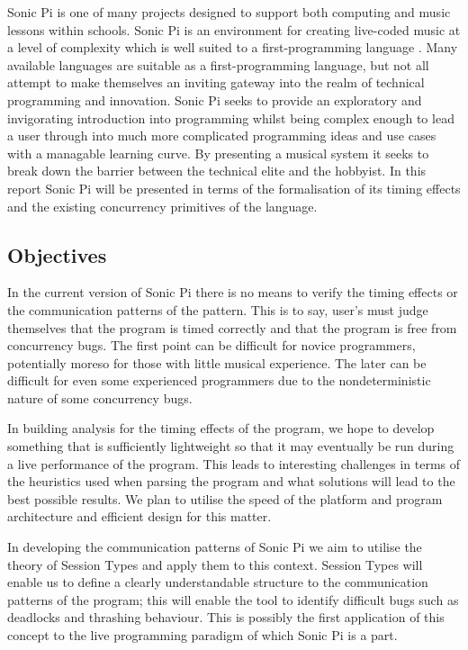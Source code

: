 \documentclass[11pt]{scrartcl}
\begin{document}
Sonic Pi is one of many projects designed to support both computing and music 
lessons within schools. Sonic Pi is an environment for creating live-coded 
music at a level of complexity which is well suited to a first-programming 
language \cite{sp}. Many available languages are suitable as a first-programming 
language, but not all attempt to make themselves an inviting gateway into the 
realm of technical programming and innovation. Sonic Pi seeks to provide an 
exploratory and invigorating introduction into programming whilst being complex 
enough to lead a user through into much more complicated programming ideas and 
use cases with a managable learning curve. By presenting a musical system it 
seeks to break down the barrier between the technical elite and the hobbyist. In 
this report Sonic Pi will be presented in terms of the formalisation of its 
timing effects and the existing concurrency primitives of the language. 

\subsection{Objectives}
In the current version of Sonic Pi there is no means to verify the timing effects
or the communication patterns of the pattern. This is to say, user's must judge
themselves that the program is timed correctly and that the program is free from
concurrency bugs. The first point can be difficult for novice programmers, 
potentially moreso for those with little musical experience. The later can be
difficult for even some experienced programmers due to the nondeterministic 
nature of some concurrency bugs.

In building analysis for the timing effects of the program, we hope to develop
something that is sufficiently lightweight so that it may eventually be run
during a live performance of the program. This leads to interesting challenges
in terms of the heuristics used when parsing the program and what solutions will 
lead to the best possible results. We plan to utilise the speed of the platform
and program architecture and efficient design for this matter.

In developing the communication patterns of Sonic Pi we aim to utilise the
theory of Session Types and apply them to this context. Session Types will
enable us to define a clearly understandable structure to the communication
patterns of the program; this will enable the tool to identify difficult bugs
such as deadlocks and thrashing behaviour. This is possibly the first application
of this concept to the live programming paradigm of which Sonic Pi is a part.
\end{document}
